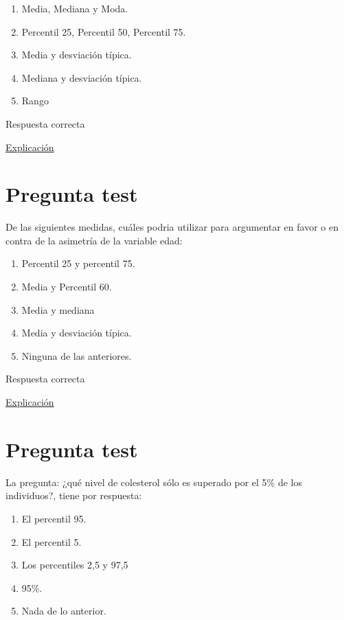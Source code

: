\documentclass[
]{book}
\providecommand{\tightlist}{%
  \setlength{\itemsep}{0pt}\setlength{\parskip}{0pt}}
\begin{document}
\begin{enumerate}
\def\labelenumi{\alph{enumi})}
\tightlist
\item
  Media, Mediana y Moda.
\item
  Percentil 25, Percentil 50, Percentil 75.
\item
  Media y desviación típica.
\item
  Mediana y desviación típica.
\item
  Rango
\end{enumerate}

Respuesta correcta

\href{https://1fjmanzano.github.io/bioestadistica/medidas-de-posicio\%CC\%81n-dispersio\%CC\%81n-y-forma.html\#medidas-de-dispersio\%CC\%81n}{Explicación}

\hypertarget{pregunta-test-70}{%
\section{Pregunta test}\label{pregunta-test-70}}

De las siguientes medidas, cuáles podria utilizar para argumentar en favor o en contra de la asimetría de la variable edad:

\begin{enumerate}
\def\labelenumi{\alph{enumi})}
\tightlist
\item
  Percentil 25 y percentil 75.
\item
  Media y Percentil 60.
\item
  Media y mediana
\item
  Media y desviación típica.
\item
  Ninguna de las anteriores.
\end{enumerate}

Respuesta correcta

\href{https://1fjmanzano.github.io/bioestadistica/medidas-de-forma.html}{Explicación}

\hypertarget{pregunta-test-71}{%
\section{Pregunta test}\label{pregunta-test-71}}

La pregunta: ¿qué nivel de colesterol sólo es superado por el 5\% de los individuos?, tiene por respuesta:

\begin{enumerate}
\def\labelenumi{\alph{enumi})}
\tightlist
\item
  El percentil 95.
\item
  El percentil 5.
\item
  Los percentiles 2,5 y 97,5
\item
  95\%.
\item
  Nada de lo anterior.
\end{enumerate}
\end{document}
